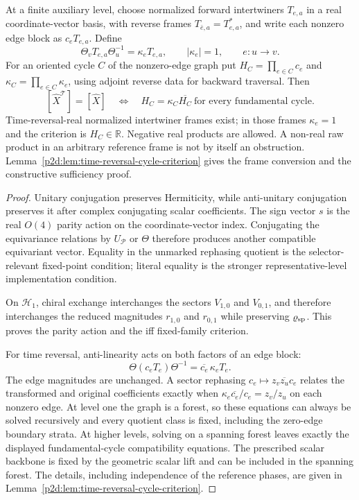 \documentclass[12pt,a4paper]{article}
\begin{document}
\begin{proposition}
At a finite auxiliary level, choose normalized forward intertwiners
\(T_{e,a}\) in a real coordinate-vector basis, with reverse frames
\(T_{\bar e,a}=T_{e,a}^*\), and write each nonzero edge block as
\(c_eT_{e,a}\).
Define
\[
 \Theta_vT_{e,a}\Theta_u^{-1}=\kappa_eT_{e,a},
 \qquad |\kappa_e|=1,\qquad e:u\to v.
\]
For an oriented cycle \(C\) of the nonzero-edge graph put
\(H_C=\prod_{e\in C}c_e\) and \(\kappa_C=\prod_{e\in C}\kappa_e\),
using adjoint reverse data for backward traversal.
Then
\[
 \boxed{
 [\widehat X^{\mathcal T}]=[\widehat X]
 \quad\Longleftrightarrow\quad
 H_C=\kappa_C\overline{H_C}
 \ \text{for every fundamental cycle}.}
\]
Time-reversal-real normalized intertwiner frames exist; in those frames
\(\kappa_e=1\) and the criterion is \(H_C\in\mathbb R\).
Negative real products are allowed.  A non-real raw product in an arbitrary
reference frame is not by itself an obstruction.
Lemma~\ref{p2d:lem:time-reversal-cycle-criterion} gives the frame conversion
and the constructive sufficiency proof.
\end{proposition}

\begin{proof}
Unitary conjugation preserves Hermiticity, while anti-unitary conjugation
preserves it after complex conjugating scalar coefficients.  The sign vector
\(s\) is the real \(O(4)\) parity action on the coordinate-vector index.
Conjugating the equivariance relations by \(U_{\mathcal P}\) or \(\Theta\)
therefore produces another compatible equivariant vector.  Equality in the
unmarked rephasing quotient is the selector-relevant fixed-point condition;
literal equality is the stronger representative-level implementation
condition.

On \(\mathcal H_1\), chiral exchange interchanges the sectors
\(V_{1,0}\) and \(V_{0,1}\), and therefore interchanges the reduced
magnitudes \(r_{1,0}\) and \(r_{0,1}\) while preserving
\(\varrho_{\rm sp}\).  This proves the parity action and the iff fixed-family
criterion.

For time reversal, anti-linearity acts on both factors of an edge block:
\[
 \Theta(c_eT_e)\Theta^{-1}
 =\overline{c_e}\,\kappa_eT_e.
\]
The edge magnitudes are unchanged.  A sector rephasing
\(c_e\mapsto z_v\overline{z_u}c_e\) relates the transformed and original
coefficients exactly when
\(\kappa_e\overline{c_e}/c_e=z_v/z_u\) on each nonzero edge.
At level one the graph is a forest, so these equations can always be solved
recursively and every quotient class is fixed, including the zero-edge
boundary strata.  At higher levels, solving on a spanning forest leaves
exactly the displayed fundamental-cycle compatibility equations.
The prescribed scalar backbone is fixed by the geometric scalar lift and
can be included in the spanning forest.
The details, including independence of the reference phases, are given in
Lemma~\ref{p2d:lem:time-reversal-cycle-criterion}.
\end{proof}
\end{document}
